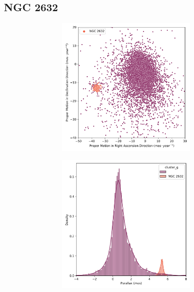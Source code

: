 \documentclass[11pt, a4paper, english]{book}
\begin{document}
\vfill

\newpage

\subsection{NGC 2632}

\begin{figure}[H]
  \vfil
  \centering
  \begin{subfigure}{0.9\textwidth}
    \centering
    \begin{subfigure}[t]{0.30\textwidth}
      \centering
      \includegraphics[width=\textwidth]{../figures/ngc_2632/pm_ngc_2632.png}
    \end{subfigure}
    \hfill
    \begin{subfigure}[t]{0.30\textwidth}
      \centering
      \includegraphics[width=\textwidth]{../figures/ngc_2632/parallax_ngc_2632.png}

\end{subfigure}
\end{subfigure}
\end{figure}
\end{document}
